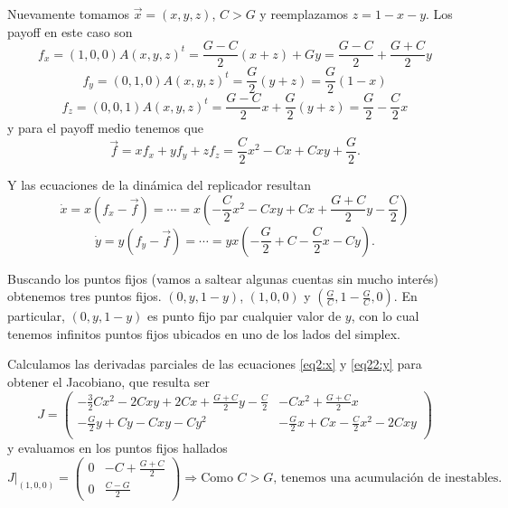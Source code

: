Nuevamente tomamos $\vec{x} = \left(x,y,z\right)$, $C>G$ y reemplazamos $z = 1-x-y$. Los payoff en este caso son
\begin{equation}
    f_x = \left(1,0,0\right) A \left(x,y,z\right)^t = \frac{G-C}{2} \left(x+z\right) + Gy = \frac{G-C}{2} + \frac{G+C}{2}y
\end{equation}
\begin{equation}
    f_y = \left(0,1,0\right) A \left(x,y,z\right)^t = \frac{G}{2} \left(y+z\right) = \frac{G}{2} \left(1-x\right)
\end{equation}
\begin{equation}
    f_z = \left(0,0,1\right) A \left(x,y,z\right)^t = \frac{G-C}{2}x + \frac{G}{2} \left(y+z\right) = \frac{G}{2} - \frac{C}{2} x
\end{equation}
y para el payoff medio tenemos que
\begin{equation}
    \vec{f} = xf_x + yf_y + zf_z = \frac{C}{2} x^2 - Cx + Cxy + \frac{G}{2}.
\end{equation}

Y las ecuaciones de la dinámica del replicador resultan
\begin{equation}
    \dot{x} = x \left(f_x - \vec{f}\right) = \cdots = x \left( -\frac{C}{2}x^2 - Cxy + Cx + \frac{G+C}{2}y -\frac{C}{2} \right)
    \label{eq2:x}
\end{equation}
\begin{equation}
    \dot{y} = y \left(f_y - \vec{f}\right) = \cdots = yx \left( -\frac{G}{2} + C - \frac{C}{2} x - Cy \right).
    \label{eq22:y}
\end{equation}

Buscando los puntos fijos (vamos a saltear algunas cuentas sin mucho interés) obtenemos tres puntos fijos. $\left(0, y, 1-y\right)$, $\left(1,0,0\right)$ y $\left(\frac{G}{C}, 1-\frac{G}{C}, 0\right)$. En particular, $\left(0, y, 1-y\right)$ es punto fijo par cualquier valor de $y$, con lo cual tenemos infinitos puntos fijos ubicados en uno de los lados del simplex.

Calculamos las derivadas parciales de las ecuaciones \ref{eq2:x} y \ref{eq22:y} para obtener el Jacobiano, que resulta ser
\begin{equation}
    J =
\begin{pmatrix}
-\frac{3}{2}Cx^2 - 2Cxy + 2Cx + \frac{G+C}{2}y - \frac{C}{2} & -Cx^2 + \frac{G+C}{2}x \\[6pt]
-\frac{G}{2}y + Cy - Cxy - C y^2  &  -\frac{G}{2}x + Cx - \frac{C}{2} x^2 - 2Cxy \\
\end{pmatrix}
\end{equation}
y evaluamos en los puntos fijos hallados
\begin{equation}
J |_{\left(1,0,0\right)} =
\begin{pmatrix}
    0  & -C + \frac{G+C}{2} \\[4pt]
    0  & \frac{C-G}{2}
\end{pmatrix}
\Rightarrow \text{Como $C > G$, tenemos una acumulación de inestables.}
\end{equation}


